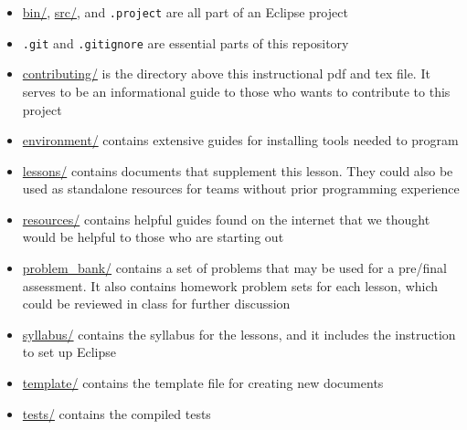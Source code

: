 \documentclass[11pt,fleqn]{article}
\begin{document}
\begin{itemize}
	\item \underline{bin/}, \underline{src/}, and \texttt{.project} are all part of an Eclipse project
	\item \texttt{.git} and \texttt{.gitignore} are essential parts of this repository 
	\item \underline{contributing/} is the directory above this instructional pdf and tex file. It serves to be an informational guide to those who wants to contribute to this project
	\item \underline{environment/} contains extensive guides for installing tools needed to program
	\item \underline{lessons/} contains documents that supplement this lesson. They could also be used as standalone resources for teams without prior programming experience
	\item \underline{resources/} contains helpful guides found on the internet that we thought would be helpful to those who are starting out
	\item \underline{problem\_bank/} contains a set of problems that may be used for a pre/final assessment. It also contains homework problem sets for each lesson, which could be reviewed in class for further discussion
	\item \underline{syllabus/} contains the syllabus for the lessons, and it includes the instruction to set up Eclipse
	\item \underline{template/} contains the template file for creating new documents
	\item \underline{tests/} contains the compiled tests

\end{itemize}
\end{document}
